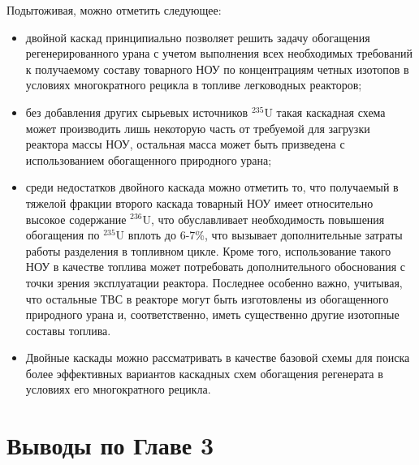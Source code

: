 Подытоживая, можно отметить следующее:

\begin{itemize}
    \item двойной каскад принципиально позволяет решить задачу обогащения регенерированного урана с учетом выполнения всех необходимых требований к получаемому составу товарного НОУ по концентрациям четных изотопов в условиях многократного рецикла в топливе легководных реакторов; 
    \item без добавления других сырьевых источников $^{235}$U такая каскадная схема может производить лишь некоторую часть от требуемой для загрузки реактора массы НОУ, остальная масса может быть призведена с использованием обогащенного природного урана;
    \item среди недостатков двойного каскада можно отметить то, что получаемый в тяжелой фракции второго каскада товарный НОУ имеет относительно высокое содержание $^{236}$U, что обуславливает необходимость повышения обогащения по $^{235}$U вплоть до 6-7\%, что вызывает дополнительные затраты работы разделения в топливном цикле. Кроме того, использование такого НОУ в качестве топлива может потребовать дополнительного обоснования с точки зрения эксплуатации реактора. Последнее особенно важно, учитывая, что остальные ТВС в реакторе могут быть изготовлены из обогащенного природного урана и, соответственно, иметь существенно другие изотопные составы топлива.
    \item Двойные каскады можно рассматривать в качестве базовой схемы для поиска более эффективных вариантов каскадных схем обогащения регенерата в условиях его многократного рецикла.
\end{itemize}

\section{Выводы по Главе 3}\label{sec:ch3/conclusion}

